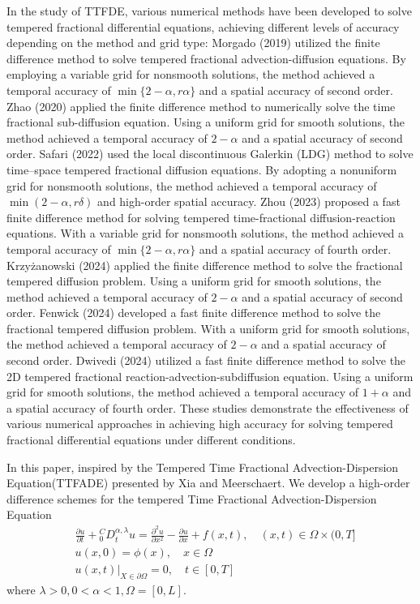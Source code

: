 \documentclass[10pt, reqno]{amsart}
\theoremstyle{remark}
\theoremstyle{definition}
\numberwithin{table}{section}
\begin{document}
In the study of TTFDE,  various numerical methods have been developed to solve tempered fractional differential equations,  achieving different levels of accuracy depending on the method and grid type: Morgado (2019)\cite{morgado2019} utilized the finite difference method to solve tempered fractional advection-diffusion equations.  By employing a variable grid for nonsmooth solutions,  the method achieved a temporal accuracy of $\min\{2 - \alpha,  r\alpha\}$ and a spatial accuracy of second order. Zhao (2020)\cite{zhao2020} applied the finite difference method to numerically solve the time fractional sub-diffusion equation.  Using a uniform grid for smooth solutions,  the method achieved a temporal accuracy of $2 - \alpha$ and a spatial accuracy of second order. Safari (2022)\cite{safari2022} used the local discontinuous Galerkin (LDG) method to solve time–space tempered fractional diffusion equations.  By adopting a nonuniform grid for nonsmooth solutions,  the method achieved a temporal accuracy of $\min(2 - \alpha,  r\delta)$ and high-order spatial accuracy. Zhou (2023)\cite{zhou2023} proposed a fast finite difference method for solving tempered time-fractional diffusion-reaction equations.  With a variable grid for nonsmooth solutions,  the method achieved a temporal accuracy of $\min\{2 - \alpha,  r\alpha\}$ and a spatial accuracy of fourth order. Krzyżanowski (2024)\cite{krzyzanowski2024} applied the finite difference method to solve the fractional tempered diffusion problem.  Using a uniform grid for smooth solutions,  the method achieved a temporal accuracy of $2 - \alpha$ and a spatial accuracy of second order. Fenwick (2024)\cite{fenwick2024} developed a fast finite difference method to solve the fractional tempered diffusion problem.  With a uniform grid for smooth solutions,  the method achieved a temporal accuracy of $2 - \alpha$ and a spatial accuracy of second order. Dwivedi (2024)\cite{dwivedi2024} utilized a fast finite difference method to solve the 2D tempered fractional reaction-advection-subdiffusion equation.  Using a uniform grid for smooth solutions,  the method achieved a temporal accuracy of $1 + \alpha$ and a spatial accuracy of fourth order. These studies demonstrate the effectiveness of various numerical approaches in achieving high accuracy for solving tempered fractional differential equations under different conditions. 

In this paper,  inspired by the Tempered Time
Fractional Advection-Dispersion Equation(TTFADE) presented by Xia\cite{xia2013} and Meerschaert\cite{meerschaert2008}. We develop a high-order difference schemes for the tempered Time Fractional Advection-Dispersion Equation
\begin{align}
&\frac{\partial u}{\partial t}+{ }_0^C D_t^{\alpha,  \lambda} u=\frac{\partial^2u}{\partial x^2}-\frac{\partial u}{\partial x}+f(x,  t),  \quad(x,  t) \in \Omega \times(0,  T]\label{Equation1}\\
& u(x,  0)=\phi(x),  \quad x \in \Omega \label{Equation2}\\
&u(x,  t)|_{X \in \partial \Omega}=0,  \quad t \in[0,  T]\label{Equation3}
\end{align}
where $\lambda > 0,  0 < \alpha < 1, \Omega=[0, L]$. 
\end{document}
